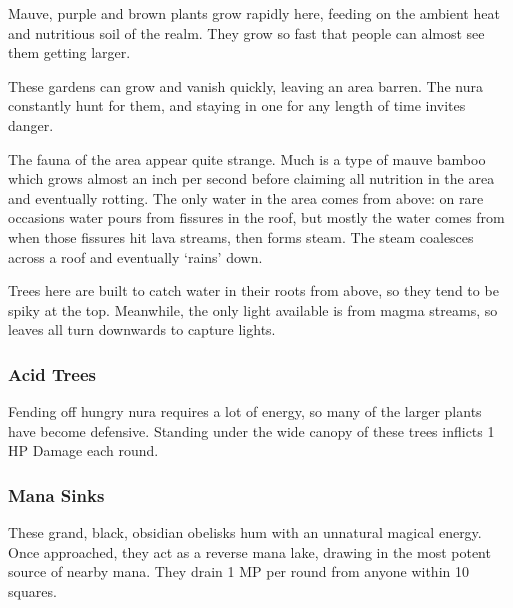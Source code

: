 \begin{multicols}{2}
Mauve, purple and brown plants grow rapidly here, feeding on the ambient heat and nutritious soil of the realm.
They grow so fast that people can almost see them getting larger.

These gardens can grow and vanish quickly, leaving an area barren.
The nura constantly hunt for them, and staying in one for any length of time invites danger.

The fauna of the area appear quite strange.
Much is a type of mauve bamboo which grows almost an inch per second before claiming all nutrition in the area and eventually rotting.
The only water in the area comes from above: on rare occasions water pours from fissures in the roof, but mostly the water comes from when those fissures hit lava streams, then forms steam.
The steam coalesces across a roof and eventually `rains' down.

Trees here are built to catch water in their roots from above, so they tend to be spiky at the top.
Meanwhile, the only light available is from magma streams, so leaves all turn downwards to capture lights.

\subsubsection{Acid Trees}

Fending off hungry nura requires a lot of energy, so many of the larger plants have become defensive.
Standing under the wide canopy of these trees inflicts 1 HP Damage each round.

\subsubsection{Mana Sinks}

These grand, black, obsidian obelisks hum with an unnatural magical energy.
Once approached, they act as a reverse mana lake, drawing in the most potent source of nearby mana.
They drain 1 MP per round from anyone within 10 squares.

\end{multicols}
